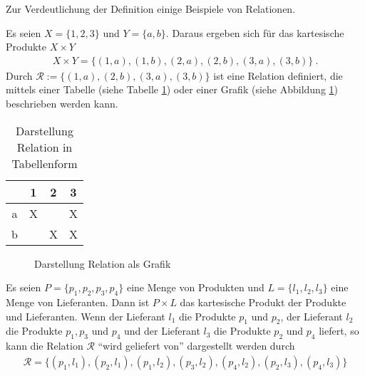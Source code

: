 \begin{Unit}[Beispiel]
Zur Verdeutlichung der Definition einige Beispiele von Relationen.

Es seien $X = \{1, 2, 3\}$ und $Y = \{a, b\}$. Daraus ergeben sich für das 
kartesische Produkte $X \times Y$ 
\begin{align}
  X \times Y = \{ (1,a), (1,b), (2,a), (2,b), (3,a), (3,b) \} \ .
\end{align}
Durch $\mathcal{R} := \{ (1,a), (2,b), (3,a), (3,b) \}$ ist eine Relation 
definiert, die mittels einer Tabelle (siehe Tabelle
\ref{tbl:rel:Darstellung Relation in Tabellenform}) oder einer Grafik 
(siehe Abbildung \ref{abb:rel:Darstellung Relation als Grafik}) beschrieben 
werden kann.

\begin{table}[htbp]
\begin{center}
  \begin{tabular}{|c|c|c|c|} \hline
      & 1 & 2 & 3 \\ \hline
    a & X &   & X \\ \hline
    b &   & X & X \\ \hline
  \end{tabular}
  \caption{Darstellung Relation in Tabellenform}
  \label{tbl:rel:Darstellung Relation in Tabellenform}
\end{center}
\end{table}

\begin{figure}[htbp]
\begin{center}
  \setlength{\unitlength}{1.0cm}
  \caption{Darstellung Relation als Grafik}
  \label{abb:rel:Darstellung Relation als Grafik}
\end{center}
\end{figure}
\end{Unit}

\begin{Unit}[Beispiel] 
  Es seien $P = \{p_1, p_2, p_3, p_4\}$ eine Menge von Produkten und $L = 
  \{l_1, l_2, l_3\}$ eine Menge von Lieferanten. Dann ist $P \times L$ das
  kartesische Produkt der Produkte und Lieferanten. Wenn der Lieferant $l_1$ 
  die Produkte $p_1$ und $p_2$, der Lieferant $l_2$ die Produkte $p_1, p_3$ 
  und $p_4$ und der Lieferant $l_3$ die Produkte $p_2$ und $p_4$ liefert, so 
  kann die Relation $\mathcal{R}$ \enquote{wird geliefert von} dargestellt 
  werden durch 
  \begin{align}
    \mathcal{R} = \{(p_1,l_1), (p_2,l_1), (p_1,l_2), (p_3,l_2), (p_4,l_2), 
      (p_2,l_3), (p_4,l_3)\}
  \end{align}
\end{Unit}


